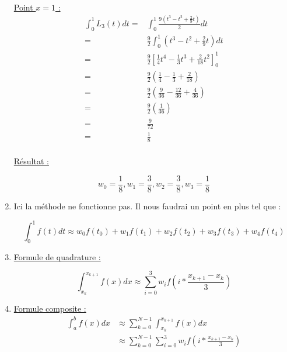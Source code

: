\documentclass{article}
\begin{document}
\begin{enumerate}
\underline{Point $x = 1$ :}
\begin{equation*}
  \begin{split}
    \int_0^1 {L_3(t) dt} = & \int_0^1 {\frac{ 9 (t^3 - t^2 + \frac{2}{9} t)}
    {2} dt}
    \\
    = & \frac{9}{2} \int_0^1 { \left(t^3 - t^2 + \frac{2}{9} t \right) dt}
    \\
    = & \frac{9}{2} \left[ \frac{1}{4}t^4 - \frac{1}{3}t^3 +
      \frac{2}{18} t^2 \right]_0^1
    \\
    = & \frac{9}{2} \left(\frac{1}{4} - \frac{1}{3} +
      \frac{2}{18} \right)
    \\
    = & \frac{9}{2} \left( \frac{9}{36} - \frac{12}{36} +
      \frac{4}{36} \right)
    \\
    = & \frac{9}{2} \left( \frac{1}{36} \right)
    \\
    = & \frac{9}{72}
    \\
    = & \frac{1}{8}
    \\
  \end{split}
\end{equation*}

\underline{Résultat :}

\begin{equation*}
    w_0 = \frac{1}{8},
    w_1 = \frac{3}{8},
    w_2 = \frac{3}{8},
    w_3 = \frac{1}{8}
\end{equation*}

\item Ici la méthode ne fonctionne pas. \newline
  Il nous faudrai un point en plus tel que :

  \begin{equation*}
    \int_0^1 {f(t) dt} \approx w_0 f(t_0) + w_1 f(t_1) + w_2 f(t_2) +
    w_3 f(t_3) + w_4 f(t_4)
  \end{equation*}
  
\item \underline{Formule de quadrature :}

  \begin{equation*}
    \int_{x_k}^{x_{k+1}} {f(x) dx} \approx \sum_{i = 0}^3 {w_i f\left(
    i * \frac{x_{k + 1} - x_k}{3} \right)}
  \end{equation*}


\item \underline{Formule composite :}
  \begin{equation*}
    \begin{split}
      \int_a^b {f(x) dx} & \approx \sum_{k = 0}^{N - 1}{\int_{x_k}^{x_{k +
            1}}{f(x) dx}} \\
      & \approx \sum_{k = 0}^{N - 1}{\sum_{i = 0}^3 {w_i f\left(
          i * \frac{x_{k + 1} - x_k}{3} \right)}}
      \end{split}
  \end{equation*}


\end{enumerate}
\end{document}
